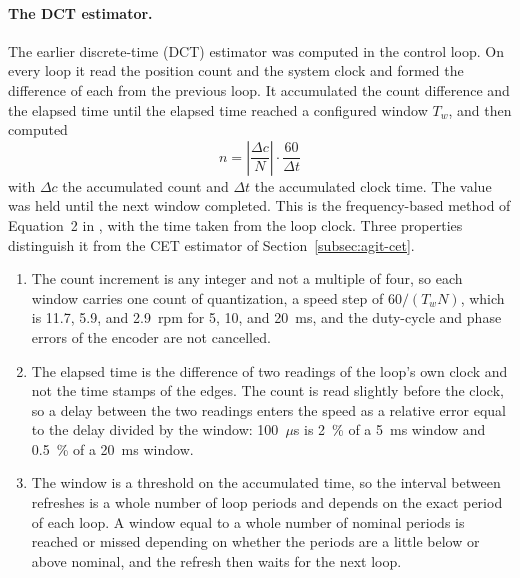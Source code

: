 \paragraph{The DCT estimator.}
The earlier discrete-time (DCT) estimator was computed in the control loop. On every loop it read the position count and the system clock and formed the difference of each from the previous loop. It accumulated the count difference and the elapsed time until the elapsed time reached a configured window $T_w$, and then computed
\begin{equation}
    n = \left| \frac{\Delta c}{N} \right| \cdot \frac{60}{\Delta t}
    \label{eq:dct}
\end{equation}
with $\Delta c$ the accumulated count and $\Delta t$ the accumulated clock time. The value was held until the next window completed. This is the frequency-based method of Equation~2 in \citet{anuchin2019}, with the time taken from the loop clock. Three properties distinguish it from the CET estimator of Section~\ref{subsec:agit-cet}.
\begin{enumerate}
    \item The count increment is any integer and not a multiple of four, so each window carries one count of quantization, a speed step of $60/(T_w N)$, which is 11.7, 5.9, and 2.9~rpm for 5, 10, and 20~ms, and the duty-cycle and phase errors of the encoder are not cancelled.
    \item The elapsed time is the difference of two readings of the loop's own clock and not the time stamps of the edges. The count is read slightly before the clock, so a delay between the two readings enters the speed as a relative error equal to the delay divided by the window: 100~$\mu$s is 2~\% of a 5~ms window and 0.5~\% of a 20~ms window.
    \item The window is a threshold on the accumulated time, so the interval between refreshes is a whole number of loop periods and depends on the exact period of each loop. A window equal to a whole number of nominal periods is reached or missed depending on whether the periods are a little below or above nominal, and the refresh then waits for the next loop.
\end{enumerate}

